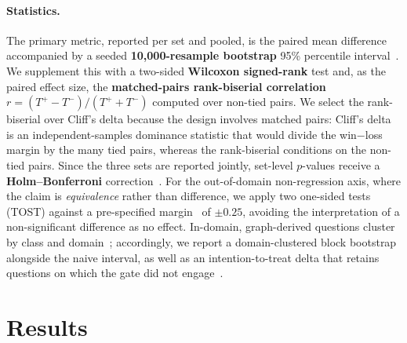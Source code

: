 \documentclass[10pt,twocolumn]{article}
\begin{document}
\paragraph{Statistics.} The primary metric, reported per set and pooled, is the paired mean difference accompanied by a seeded \textbf{10{,}000-resample bootstrap} 95\% percentile interval~\cite{efron1979bootstrap,koehn2004significance}. We supplement this with a two-sided \textbf{Wilcoxon signed-rank} test and, as the paired effect size, the \textbf{matched-pairs rank-biserial correlation} $r=(T^{+}-T^{-})/(T^{+}+T^{-})$ computed over non-tied pairs. We select the rank-biserial over Cliff's delta because the design involves matched pairs: Cliff's delta is an independent-samples dominance statistic that would divide the win$-$loss margin by the many tied pairs, whereas the rank-biserial conditions on the non-tied pairs. Since the three sets are reported jointly, set-level $p$-values receive a \textbf{Holm--Bonferroni} correction~\cite{dror2018hitchhiker}. For the out-of-domain non-regression axis, where the claim is \emph{equivalence} rather than difference, we apply two one-sided tests (TOST) against a pre-specified margin~\cite{lakens2017equivalence} of $\pm0.25$, avoiding the interpretation of a non-significant difference as no effect. In-domain, graph-derived questions cluster by class and domain~\cite{dror2018hitchhiker}; accordingly, we report a domain-clustered block bootstrap alongside the naive interval, as well as an intention-to-treat delta that retains questions on which the gate did not engage~\cite{hollis1999itt}.

\section{Results}\label{sec:results}
\end{document}

